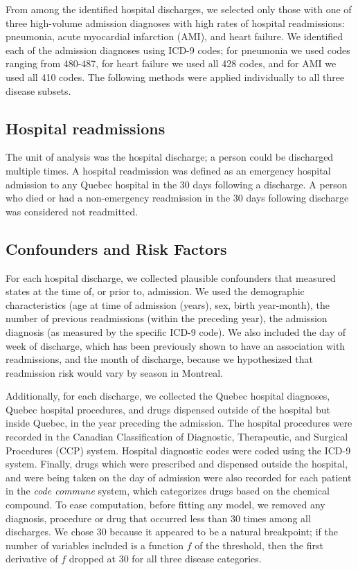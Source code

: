 \documentclass[]{article}\usepackage[]{graphicx}\usepackage[]{color}
\begin{document}
From among the identified hospital discharges, we selected only those with one of three high-volume admission diagnoses with high rates of hospital readmissions: pneumonia, acute myocardial infarction (AMI), and heart failure. We identified each of the admission diagnoses using ICD-9 codes; for pneumonia we used codes ranging from 480-487, for heart failure we used all 428 codes, and for AMI we used all 410 codes. The following methods were applied individually to all three disease subsets.

\subsection{Hospital readmissions}
The unit of analysis was the hospital discharge; a person could be discharged multiple times. A hospital readmission was defined as an emergency hospital admission to any Quebec hospital in the 30 days following a discharge.  A person who died or had a non-emergency readmission in the 30 days following discharge was considered not readmitted.

\subsection{Confounders and Risk Factors}
For each hospital discharge, we collected plausible confounders that measured states at the time of, or prior to, admission. We used the demographic characteristics (age at time of admission (years), sex, birth year-month), the number of previous readmissions (within the preceding year), the admission diagnosis (as measured by the specific ICD-9 code). We also included the day of week of discharge, which has been previously shown to have an association with readmissions\supercite{van_walraven_risk_2002}, and the month of discharge, because we hypothesized that readmission risk would vary by season in Montreal.

Additionally, for each discharge, we collected the Quebec hospital diagnoses, Quebec hospital procedures, and drugs dispensed outside of the hospital but inside Quebec, in the year preceding the admission. The hospital procedures were recorded in the Canadian Classification of Diagnostic, Therapeutic, and Surgical Procedures (CCP) system. Hospital diagnostic codes were coded using the ICD-9 system. Finally, drugs which were prescribed and dispensed outside the hospital, and were being taken on the day of admission were also recorded for each patient in the \emph{code commune} system, which categorizes drugs based on the chemical compound. To ease computation, before fitting any model, we removed any diagnosis, procedure or drug that occurred less than 30 times among all discharges. We chose 30 because it appeared to be a natural breakpoint; if the number of variables included is a function $f$ of the threshold, then the first derivative of $f$ dropped at 30 for all three disease categories.
\end{document}
